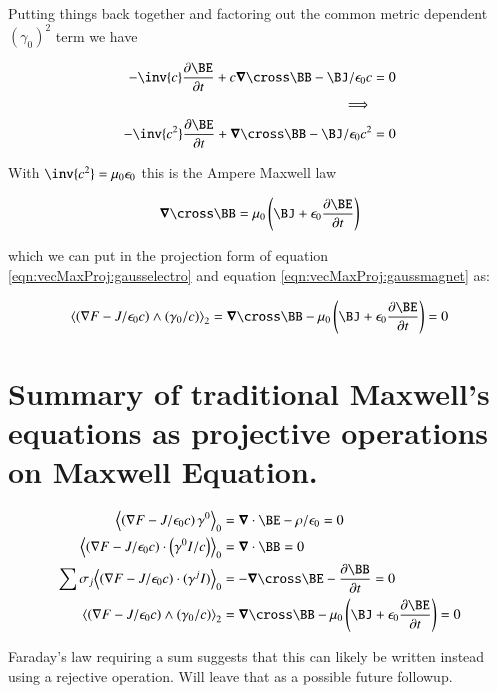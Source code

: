Putting things back together and factoring out the common metric dependent $(\gamma_0)^2$ term we have

\begin{align*}
- \inv{c} \PD{t}{\BE} + c \spacegrad \cross \BB - \BJ/\epsilon_0 c &= 0 \\
\implies \\
- \inv{c^2} \PD{t}{\BE} + \spacegrad \cross \BB - \BJ/\epsilon_0 c^2 &= 0
\end{align*}

With $\inv{c^2} = \mu_0 \epsilon_0$ this is the Ampere Maxwell law

\begin{equation}
\spacegrad \cross \BB = \mu_0 \left(\BJ + \epsilon_0 \PD{t}{\BE} \right)
\end{equation}

which we can put in the projection form of equation \ref{eqn:vecMaxProj:gausselectro} and equation \ref{eqn:vecMaxProj:gaussmagnet} as:

\begin{equation}\label{eqn:vecMaxProj:amperemaxwell}
\gpgradetwo{\left(\grad F - J/\epsilon_0 c\right) \wedge (\gamma_0/c)} =
\spacegrad \cross \BB - \mu_0 \left(\BJ + \epsilon_0 \PD{t}{\BE} \right) = 0
\end{equation}

\section{Summary of traditional Maxwell's equations as projective operations on Maxwell Equation. }

\begin{align}
\gpgradezero{\left(\grad F - J/\epsilon_0 c\right) \gamma^0} &= \spacegrad \cdot \BE - \rho/\epsilon_0 = 0 \\
\gpgradezero{\left(\grad F - J/\epsilon_0 c\right) \cdot \left(\gamma^0 I / c \right)} &= \spacegrad \cdot \BB = 0 \\
\sum \sigma_j \gpgradezero{( \grad F - J/\epsilon_0 c ) \cdot (\gamma^j I)} &= -\spacegrad \cross \BE - \PD{t}{\BB} = 0 \\
\gpgradetwo{\left(\grad F - J/\epsilon_0 c\right) \wedge (\gamma_0/c)} &= \spacegrad \cross \BB - \mu_0 \left(\BJ + \epsilon_0 \PD{t}{\BE} \right) = 0
\end{align}

Faraday's law requiring a sum suggests that this can likely be written instead using a rejective operation.  Will leave that as a possible future followup.
